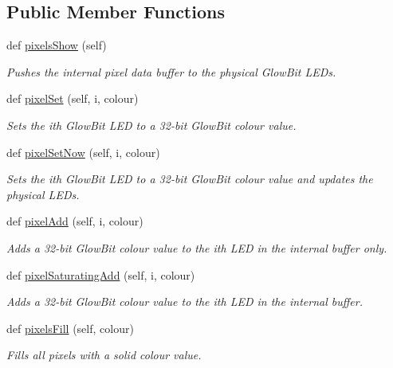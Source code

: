 \subsection*{Public Member Functions}
\begin{DoxyCompactItemize}
\item 
def \hyperlink{classglowbit_1_1glowbit_a051aed2a4969fdcb0466e4e840209279}{pixels\+Show} (self)
\begin{DoxyCompactList}\small\item\em Pushes the internal pixel data buffer to the physical Glow\+Bit L\+E\+Ds. \end{DoxyCompactList}\item 
def \hyperlink{classglowbit_1_1glowbit_a6184de87721652f9f55f9301f6a3a9ce}{pixel\+Set} (self, i, colour)
\begin{DoxyCompactList}\small\item\em Sets the i\textquotesingle{}th Glow\+Bit L\+ED to a 32-\/bit Glow\+Bit colour value. \end{DoxyCompactList}\item 
def \hyperlink{classglowbit_1_1glowbit_a6f4167e566106d5eb104933b256f2e14}{pixel\+Set\+Now} (self, i, colour)
\begin{DoxyCompactList}\small\item\em Sets the i\textquotesingle{}th Glow\+Bit L\+ED to a 32-\/bit Glow\+Bit colour value and updates the physical L\+E\+Ds. \end{DoxyCompactList}\item 
def \hyperlink{classglowbit_1_1glowbit_a8bb7ba36b4b7746f215ebad1acc0f5e2}{pixel\+Add} (self, i, colour)
\begin{DoxyCompactList}\small\item\em Adds a 32-\/bit Glow\+Bit colour value to the i\textquotesingle{}th L\+ED in the internal buffer only. \end{DoxyCompactList}\item 
def \hyperlink{classglowbit_1_1glowbit_a0db675789faef3399ffb2c1213c12048}{pixel\+Saturating\+Add} (self, i, colour)
\begin{DoxyCompactList}\small\item\em Adds a 32-\/bit Glow\+Bit colour value to the i\textquotesingle{}th L\+ED in the internal buffer. \end{DoxyCompactList}\item 
def \hyperlink{classglowbit_1_1glowbit_aca86823fecc4949692ac18f8c21e34ac}{pixels\+Fill} (self, colour)
\begin{DoxyCompactList}\small\item\em Fills all pixels with a solid colour value. \end{DoxyCompactList}\item 

\end{DoxyCompactItemize}

